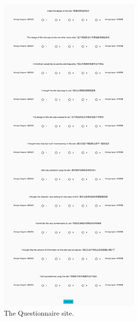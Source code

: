 \begin{figure}[h]
	\centering
	\includegraphics[width=70mm]{Images/sus.png}
	\decoRule
	\caption[SUS]{The Questionnaire site.}
	\label{fig:sus_site}
\end{figure}



